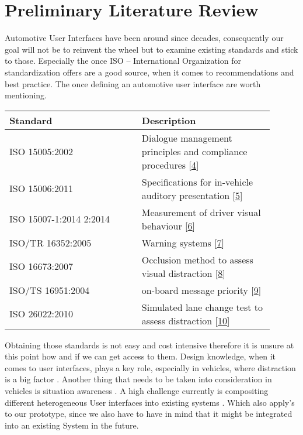 \documentclass{sig-alternate}
\begin{document}
\section{Preliminary Literature Review}
Automotive User Interfaces have been around since decades, consequently our goal will not be to reinvent the wheel but to examine existing standards and stick to those. Especially the once ISO – International Organization for standardization offers are a good source, when it comes to recommendations and best practice. The once defining an automotive user interface are worth mentioning. 

\noindent
\def\arraystretch{1.2}
\begin{tabular}{p{0.45\linewidth} | p{0.45\linewidth}}
Standard & Description \\\hline
ISO 15005:2002 & Dialogue management principles and compliance procedures [\href{http://www.iso.org/iso/home/store/catalogue_tc/catalogue_detail.htm?csnumber=34085}{4}]\\\hline
ISO 15006:2011 & Specifications for in-vehicle auditory presentation [\href{http://www.iso.org/iso/home/store/catalogue_tc/catalogue_detail.htm?csnumber=55322}{5}]\\\hline
ISO 15007-1:2014 2:2014 & Measurement of driver visual behaviour [\href{http://www.iso.org/iso/home/store/catalogue_tc/catalogue_detail.htm?csnumber=63220}{6}]\\\hline
ISO/TR 16352:2005 & Warning systems [\href{http://www.iso.org/iso/home/store/catalogue_tc/catalogue_detail.htm?csnumber=37859}{7}]\\\hline
ISO 16673:2007 & Occlusion method to assess visual distraction [\href{http://www.iso.org/iso/home/store/catalogue_tc/catalogue_detail.htm?csnumber=38035\#5}{8}]\\\hline
ISO/TS 16951:2004 & on-board message priority [\href{http://www.iso.org/iso/home/store/catalogue_tc/catalogue_detail.htm?csnumber=29024}{9}] \\\hline
ISO 26022:2010 & Simulated lane change test to assess distraction [\href{http://www.iso.org/iso/home/store/catalogue_tc/catalogue_detail.htm?csnumber=43361}{10}]
\end{tabular}
Obtaining those standards is not easy and cost intensive therefore it is unsure at this point how and if we can get access to them. Design knowledge, when it comes to  user interfaces, plays a key role, especially in vehicles, where distraction is a big factor  \cite{Developmentofanautomotiveuserinterfacedesignknowledgesystem}.
 Another thing that needs to be taken into consideration in vehicles is situation awareness \cite{Skrypchuk2016}. A high challenge currently is compositing different heterogeneous User interfaces into existing systems \cite{Holstein2015}. Which also apply's to our prototype, since we also have to have in mind that it might be integrated into an existing System in the future.

 

\end{document}
